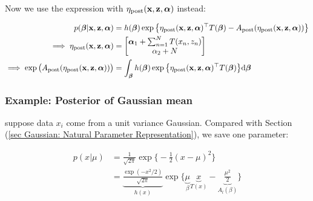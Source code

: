 \documentclass{article}
\def\post{\text{post}}
\begin{document}
\begin{enumerate}
Now we use the expression with $\eta_\post (\x,\z,\aalpha) $ instead:

\begin{equation}\begin{split}
p(\bbeta | \x, \z, \aalpha) &= h (\bbeta) \exp \big\{ \eta_\post (\x,\z,\aalpha)^\top T(\bbeta) - A_\post (\eta_\post (\x, \z, \aalpha)) \big\}\\
\implies  \eta_\post (\x,\z,\aalpha) &= \begin{bmatrix} \aalpha_1 +\sum_{n=1}^{N}  T ( x_n, z_n)  \\ \alpha_2  + N \end{bmatrix}\\
\implies \exp \big( A_\post (\eta_\post (\x, \z, \aalpha)) \big) &= \int_{\bbeta} h (\bbeta) \exp \big\{ \eta_\post (\x,\z,\aalpha)^\top T(\bbeta) \big\} \d \bbeta
\end{split}\end{equation}


\end{enumerate}






\subsubsection{Example: Posterior of Gaussian mean}

 

suppose data $x_i$ come from a unit variance Gaussian. Compared with Section (\ref{sec Gaussian: Natural Parameter Representation}), we save one parameter:

\begin{equation}\begin{split}
p( x | \mu ) &= \frac{1}{\sqrt{2 \pi}} \exp \Big\{  -\frac{ 1}{2 } ( x - \mu)^2   \Big\} \\
&= \underbrace{\frac{\exp \left( - x^2/2   \right) }{\sqrt{2 \pi}  }}_{h(x)} \exp \Big\{ \underbrace{\mu}_{\beta} \underbrace{x}_{T(x)} - \underbrace{ \frac{ \mu^2}{2 }}_{A_l(\beta)}  \Big\} \\
\end{split}\end{equation}
\end{document}
